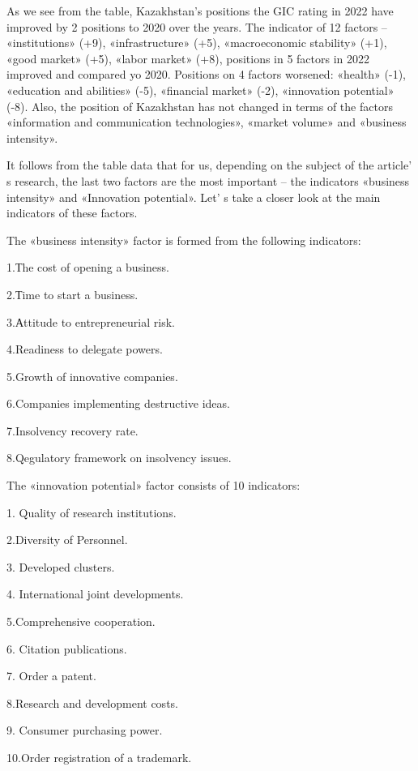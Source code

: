 \begin{multicols}{2}
As we see from the table, Kazakhstan's positions the GIC rating in 2022
have improved by 2 positions to 2020 over the years. The indicator of 12
factors -- «institutions» (+9), «infrastructure» (+5), «macroeconomic
stability» (+1), «good market» (+5), «labor market» (+8), positions in 5
factors in 2022 improved and compared yo 2020. Positions on 4 factors
worsened: «health» (-1), «education and abilities» (-5), «financial
market» (-2), «innovation potential» (-8). Also, the position of
Kazakhstan has not changed in terms of the factors «information and
communication technologies», «market volume» and «business intensity».

It follows from the table data that for us, depending on the subject of
the article' s research, the last two factors are the
most important -- the indicators «business intensity» and «Innovation
potential». Let' s take a closer look at the main
indicators of these factors.

The «business intensity» factor is formed from the following indicators:

1.Тhe cost of opening a business.

2.Тime to start a business.

3.Аttitude to entrepreneurial risk.

4.Readiness to delegate powers.

5.Growth of innovative companies.

6.Companies implementing destructive ideas.

7.Insolvency recovery rate.

8.Qegulatory framework on insolvency issues.

The «innovation potential» factor consists of 10 indicators:

1. Quality of research institutions.

2.Diversity of Personnel.

3. Developed clusters.

4. International joint developments.

5.Comprehensive cooperation.

6. Citation publications.

7. Order a patent.

8.Research and development costs.

9. Consumer purchasing power.

10.Order registration of a trademark.
\end{multicols}


